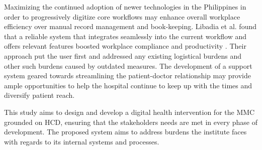 \documentclass[11pt,a4paper,titlepage]{article}
\begin{document}
	Maximizing the continued adoption of newer technologies in the Philippines in order to progressively digitize core workflows may enhance overall workplace efficiency over manual record management and book-keeping. Libadia et al. \cite{libadia_2025_development} found that a reliable system that integrates seamlessly into the current workflow and offers relevant features boosted workplace compliance and productivity . Their approach put the user first and addressed any existing logistical burdens and other such burdens caused by outdated measures. The development of a support system geared towards streamlining the patient-doctor relationship may provide ample opportunities to help the hospital continue to keep up with the times and diversify patient reach. 
	
	This study aims to design and develop a digital health intervention for the MMC grounded on HCD, ensuring that the stakeholders needs are met in every phase of development. The proposed system aims to address burdens the institute faces with regards to its internal systems and processes.
	
	
\end{document}
